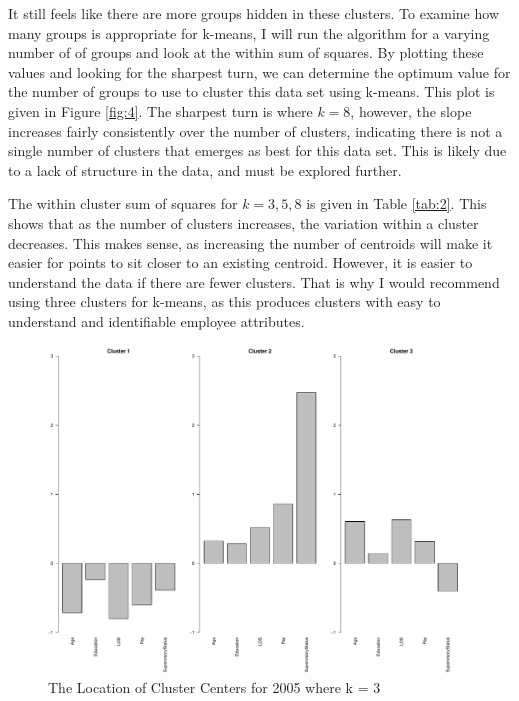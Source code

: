 \documentclass{article}
\begin{document}
    \par
    It still feels like there are more groups hidden in these clusters. To examine how many groups is appropriate for k-means, I will run the algorithm for a varying number of of groups and look at the within sum of squares. By plotting these values and looking for the sharpest turn, we can determine the optimum value for the number of groups to use to cluster this data set using k-means. This plot is given in Figure \ref{fig:4}. The sharpest turn is where $k = 8$, however, the slope increases fairly consistently over the number of clusters, indicating there is not a single number of clusters that emerges as best for this data set. This is likely due to a lack of structure in the data, and must be explored further.
    \par
    The within cluster sum of squares for $k = 3, 5, 8$ is given in Table \ref{tab:2}. This shows that as the number of clusters increases, the variation within a cluster decreases. This makes sense, as increasing the number of centroids will make it easier for points to sit closer to an existing centroid. However, it is easier to understand the data if there are fewer clusters. That is why I would recommend using three clusters for k-means, as this produces clusters with easy to understand and identifiable employee attributes.

    \begin{center}
        \begin{figure}
            \includegraphics[scale=0.4]{./images/3-cluster-center-2005.pdf}
            \caption{The Location of Cluster Centers for 2005 where k = 3}
            \label{fig:1}
        \end{figure}
    \end{center}
\end{document}
